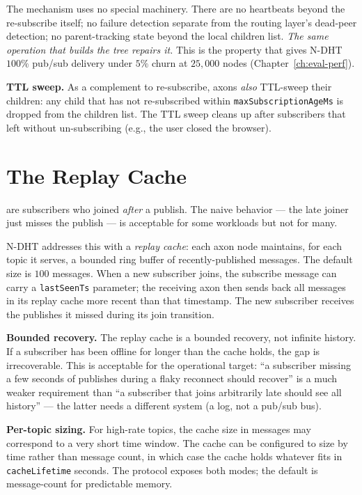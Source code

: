 \documentclass[twoside,nobib]{tufte-book}
\newcommand{\NDHT}{N-DHT\xspace}
\begin{document}
The mechanism uses no special machinery. There are no heartbeats
beyond the re-subscribe itself; no failure detection separate
from the routing layer's dead-peer detection; no parent-tracking
state beyond the local children list. \emph{The same operation
that builds the tree repairs it.} This is the property that gives
\NDHT $100\%$ pub/sub delivery under $5\%$ churn at $25{,}000$
nodes (Chapter~\ref{ch:eval-perf}).

\textbf{TTL sweep.} As a complement to re-subscribe, axons
\emph{also} TTL-sweep their children: any child that has not
re-subscribed within \texttt{maxSubscriptionAgeMs} is dropped from
the children list. The TTL sweep cleans up after subscribers that
left without un-subscribing (e.g., the user closed the browser).

\section{The Replay Cache}

 are subscribers who joined
\emph{after} a publish. The naive behavior --- the late joiner
just misses the publish --- is acceptable for some workloads but
not for many.

\NDHT addresses this with a \emph{replay cache}: each axon node
maintains, for each topic it serves, a bounded ring buffer of
recently-published messages. The default size is $100$ messages.
When a new subscriber joins, the subscribe message can carry a
\texttt{lastSeenTs} parameter; the receiving axon then sends back
all messages in its replay cache more recent than that timestamp.
The new subscriber receives the publishes it missed during its
join transition.

\textbf{Bounded recovery.} The replay cache is a bounded
recovery, not infinite history. If a subscriber has been offline
for longer than the cache holds, the gap is irrecoverable. This
is acceptable for the operational target: ``a subscriber missing
a few seconds of publishes during a flaky reconnect should
recover'' is a much weaker requirement than ``a subscriber that
joins arbitrarily late should see all history'' --- the latter
needs a different system (a log, not a pub/sub bus).

\textbf{Per-topic sizing.} For high-rate topics, the cache size
in messages may correspond to a very short time window. The
cache can be configured to size by time rather than message
count, in which case the cache holds whatever fits in
\texttt{cacheLifetime} seconds. The protocol exposes both modes;
the default is message-count for predictable memory.
\end{document}
